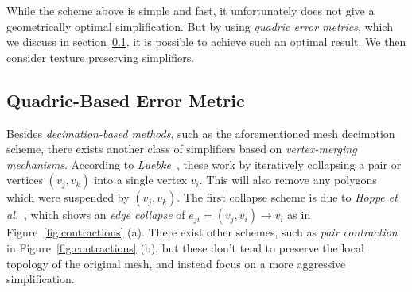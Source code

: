 While the scheme above is simple and fast, it unfortunately does not give a geometrically optimal simplification. But by using \emph{quadric error metrics}, which we discuss in section~\ref{sec:quadric-based_error_metric}, it is possible to achieve such an optimal result. We then consider texture preserving simplifiers.

\subsection{Quadric-Based Error Metric} \label{sec:quadric-based_error_metric}

Besides \emph{decimation-based methods}, such as the aforementioned mesh decimation scheme, there exists another class of simplifiers based on \emph{vertex-merging mechanisms}. According to \emph{Luebke}~\cite{luebke2001developer}, these work by iteratively collapsing a pair or vertices \((v_j, v_k)\) into a single vertex \(v_i\). This will also remove any polygons which were suspended by \((v_j, v_k)\). The first collapse scheme is due to \emph{Hoppe et al.}~\cite{hoppe1993mesh}, which shows an \emph{edge collapse} of \(e_{ji} = (v_j, v_i) \rightarrow v_i\) as in Figure~\ref{fig:contractions} (a). There exist other schemes, such as \emph{pair contraction} in Figure~\ref{fig:contractions} (b), but these don't tend to preserve the local topology of the original mesh, and instead focus on a more aggressive simplification.

